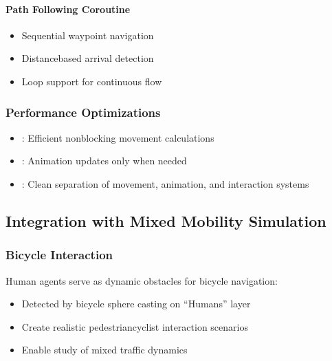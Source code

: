 \documentclass[letterpaper,10pt,english]{jupyterBook}
\begin{document}
\paragraph{Path Following Coroutine}
\label{\detokenize{Human Agent:path-following-coroutine}}\begin{itemize}
\item {} 
\sphinxAtStartPar
Sequential waypoint navigation

\item {} 
\sphinxAtStartPar
Distance\sphinxhyphen{}based arrival detection

\item {} 
\sphinxAtStartPar
Loop support for continuous flow

\end{itemize}


\subsubsection{Performance Optimizations}
\label{\detokenize{Human Agent:performance-optimizations}}\begin{itemize}
\item {} 
\sphinxAtStartPar
{}: Efficient non\sphinxhyphen{}blocking movement calculations

\item {} 
\sphinxAtStartPar
{}: Animation updates only when needed

\item {} 
\sphinxAtStartPar
{}: Clean separation of movement, animation, and interaction systems

\end{itemize}


\subsection{Integration with Mixed Mobility Simulation}
\label{\detokenize{Human Agent:integration-with-mixed-mobility-simulation}}

\subsubsection{Bicycle Interaction}
\label{\detokenize{Human Agent:bicycle-interaction}}
\sphinxAtStartPar
Human agents serve as dynamic obstacles for bicycle navigation:
\begin{itemize}
\item {} 
\sphinxAtStartPar
Detected by bicycle sphere casting on “Humans” layer

\item {} 
\sphinxAtStartPar
Create realistic pedestrian\sphinxhyphen{}cyclist interaction scenarios

\item {} 
\sphinxAtStartPar
Enable study of mixed traffic dynamics

\end{itemize}
\end{document}
